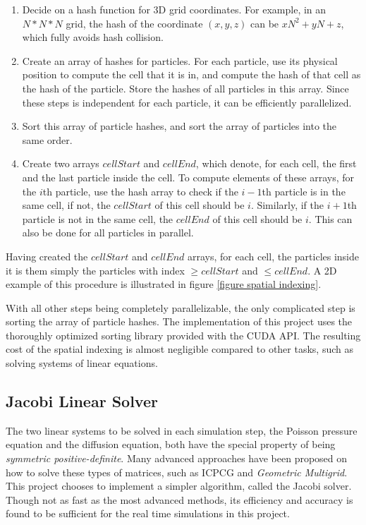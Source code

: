 \begin{enumerate}
    \item Decide on a hash function for 3D grid coordinates. For example, in an $N*N*N$ grid, the hash of the coordinate $(x,y,z)$ can be $xN^2+yN+z$, which fully avoids hash collision.
    
    \item Create an array of hashes for particles. For each particle, use its physical position to compute the cell that it is in, and compute the hash of that cell as the hash of the particle. Store the hashes of all particles in this array. Since these steps is independent for each particle, it can be efficiently parallelized.
    
    \item Sort this array of particle hashes, and sort the array of particles into the same order. 
    
    \item Create two arrays $cellStart$ and $cellEnd$, which denote, for each cell, the first and the last particle inside the cell. To compute elements of these arrays, for the $i$th particle, use the hash array to check if the $i-1$th particle is in the same cell, if not, the $cellStart$ of this cell should be $i$. Similarly, if the $i+1$th particle is not in the same cell, the $cellEnd$ of this cell should be $i$. This can also be done for all particles in parallel.
    
\end{enumerate}
Having created the $cellStart$ and $cellEnd$ arrays, for each cell, the particles inside it is them simply the particles with index $\geq cellStart$ and $\leq cellEnd$. A 2D example of this procedure is illustrated in figure \ref{figure spatial indexing}.

With all other steps being completely parallelizable, the only complicated step is sorting the array of particle hashes. The implementation of this project uses the thoroughly optimized sorting library provided with the CUDA API. The resulting cost of the spatial indexing is almost negligible compared to other tasks, such as solving systems of linear equations.



\subsection{Jacobi Linear Solver}
The two linear systems to be solved in each simulation step, the Poisson pressure equation and the diffusion equation, both have the special property of being \textit{symmetric positive-definite}. Many advanced approaches have been proposed on how to solve these types of matrices, such as ICPCG \cite{bridson2015fluid} and \textit{Geometric Multigrid}\cite{chentanez2011real}. This project chooses to implement a simpler algorithm, called the Jacobi solver. Though not as fast as the most advanced methods, its efficiency and accuracy is found to be sufficient for the real time simulations in this project.

